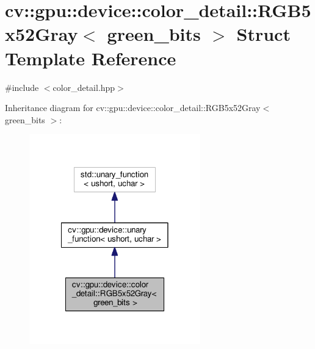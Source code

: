 \hypertarget{structcv_1_1gpu_1_1device_1_1color__detail_1_1RGB5x52Gray}{\section{cv\-:\-:gpu\-:\-:device\-:\-:color\-\_\-detail\-:\-:R\-G\-B5x52\-Gray$<$ green\-\_\-bits $>$ Struct Template Reference}
\label{structcv_1_1gpu_1_1device_1_1color__detail_1_1RGB5x52Gray}
}


{\ttfamily \#include $<$color\-\_\-detail.\-hpp$>$}



Inheritance diagram for cv\-:\-:gpu\-:\-:device\-:\-:color\-\_\-detail\-:\-:R\-G\-B5x52\-Gray$<$ green\-\_\-bits $>$\-:\nopagebreak
\begin{figure}[H]
\begin{center}
\leavevmode
\includegraphics[width=210pt]{structcv_1_1gpu_1_1device_1_1color__detail_1_1RGB5x52Gray__inherit__graph}
\end{center}
\end{figure}


